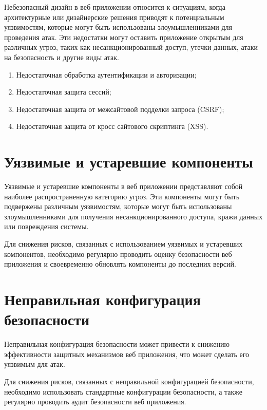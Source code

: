 Небезопасный дизайн в веб приложении относится к ситуациям, когда архитектурные или дизайнерские решения приводят к потенциальным уязвимостям, которые могут быть использованы злоумышленниками для проведения атак. Эти недостатки могут оставить приложение открытым для различных угроз, таких как несанкционированный доступ, утечки данных, атаки на безопасность и другие виды атак.

\begin{enumerate}
    \item Недостаточная обработка аутентификации и авторизации;
    \item Недостаточная защита сессий;
    \item Недостаточная защита от межсайтовой подделки запроса (CSRF);
    \item Недостаточная защита от кросс сайтового скриптинга (XSS).
\end{enumerate}


\vspace{20pt}
{\let\clearpage\relax \chapter{Уязвимые и устаревшие компоненты}}

Уязвимые и устаревшие компоненты в веб приложении представляют собой наиболее распространенную категорию угроз. Эти компоненты могут быть подвержены различным уязвимостям, которые могут быть использованы злоумышленниками для получения несанкционированного доступа, кражи данных или повреждения системы.

Для снижения рисков, связанных с использованием уязвимых и устаревших компонентов, необходимо регулярно проводить оценку безопасности веб приложения и своевременно обновлять компоненты до последних версий.

\vspace{20pt}
{\let\clearpage\relax \chapter{Неправильная конфигурация безопасности}}

Неправильная конфигурация безопасности может привести к снижению эффективности защитных механизмов веб приложения, что может сделать его уязвимым для атак.

Для снижения рисков, связанных с неправильной конфигурацией безопасности, необходимо использовать стандартные конфигурации безопасности, а также регулярно проводить аудит безопасности веб приложения.

